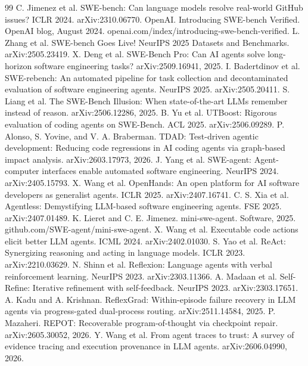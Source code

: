 \documentclass{article}
\begin{document}
\begin{thebibliography}{99}
 C. Jimenez et al. SWE-bench: Can language models resolve real-world GitHub issues? ICLR 2024. arXiv:2310.06770.
 OpenAI. Introducing SWE-bench Verified. OpenAI blog, August 2024. openai.com/index/introducing-swe-bench-verified.
 L. Zhang et al. SWE-bench Goes Live! NeurIPS 2025 Datasets and Benchmarks. arXiv:2505.23419.
 X. Deng et al. SWE-Bench Pro: Can AI agents solve long-horizon software engineering tasks? arXiv:2509.16941, 2025.
 I. Badertdinov et al. SWE-rebench: An automated pipeline for task collection and decontaminated evaluation of software engineering agents. NeurIPS 2025. arXiv:2505.20411.
 S. Liang et al. The SWE-Bench Illusion: When state-of-the-art LLMs remember instead of reason. arXiv:2506.12286, 2025.
 B. Yu et al. UTBoost: Rigorous evaluation of coding agents on SWE-Bench. ACL 2025. arXiv:2506.09289.
 P. Alonso, S. Yovine, and V. A. Braberman. TDAD: Test-driven agentic development: Reducing code regressions in AI coding agents via graph-based impact analysis. arXiv:2603.17973, 2026.
 J. Yang et al. SWE-agent: Agent-computer interfaces enable automated software engineering. NeurIPS 2024. arXiv:2405.15793.
 X. Wang et al. OpenHands: An open platform for AI software developers as generalist agents. ICLR 2025. arXiv:2407.16741.
 C. S. Xia et al. Agentless: Demystifying LLM-based software engineering agents. FSE 2025. arXiv:2407.01489.
 K. Lieret and C. E. Jimenez. mini-swe-agent. Software, 2025. github.com/SWE-agent/mini-swe-agent.
 X. Wang et al. Executable code actions elicit better LLM agents. ICML 2024. arXiv:2402.01030.
 S. Yao et al. ReAct: Synergizing reasoning and acting in language models. ICLR 2023. arXiv:2210.03629.
 N. Shinn et al. Reflexion: Language agents with verbal reinforcement learning. NeurIPS 2023. arXiv:2303.11366.
 A. Madaan et al. Self-Refine: Iterative refinement with self-feedback. NeurIPS 2023. arXiv:2303.17651.
 A. Kadu and A. Krishnan. ReflexGrad: Within-episode failure recovery in LLM agents via progress-gated dual-process routing. arXiv:2511.14584, 2025.
 P. Mazaheri. REPOT: Recoverable program-of-thought via checkpoint repair. arXiv:2605.30052, 2026.
 Y. Wang et al. From agent traces to trust: A survey of evidence tracing and execution provenance in LLM agents. arXiv:2606.04990, 2026.

\end{thebibliography}
\end{document}
